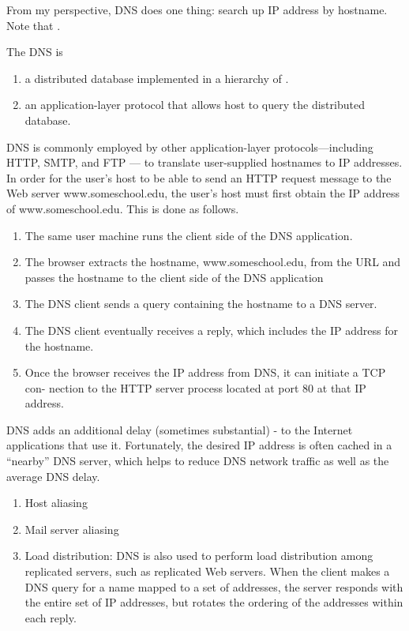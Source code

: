 \hf
From my perspective, DNS does one thing: search up IP address by hostname.\\
Note that .

The DNS is
\begin{enumerate}
    \item a distributed database implemented in a hierarchy of .
    \item an application-layer protocol that allows host to query the distributed database.
\end{enumerate}

DNS is commonly employed by other application-layer protocols---including HTTP,
SMTP, and FTP --- to translate user-supplied hostnames to IP addresses. In order for
the user's host to be able to send an HTTP request message to the Web server www.someschool.edu, the user’s host must first obtain
the IP address of www.someschool.edu. This is done as follows.

\begin{enumerate}
    \item The same user machine runs the client side of the DNS application.
    \item The browser extracts the hostname, www.someschool.edu, from the URL
          and passes the hostname to the client side of the DNS application
    \item The DNS client sends a query containing the hostname to a DNS server.
    \item The DNS client eventually receives a reply, which includes the IP address for
          the hostname.
    \item Once the browser receives the IP address from DNS, it can initiate a TCP con-
          nection to the HTTP server process located at port 80 at that IP address.
\end{enumerate}


DNS adds an additional delay (sometimes substantial) - to the Internet applications
that use it. Fortunately, the
desired IP address is often cached in a “nearby” DNS server, which helps to reduce
DNS network traffic as well as the average DNS delay.



\begin{enumerate}
    \item Host aliasing
    \item Mail server aliasing
    \item Load distribution: DNS is also used to perform load distribution among replicated servers, such as replicated Web servers. When the client makes a DNS query for a name
    mapped to a set of addresses, the server responds with the entire set of IP addresses,
    but rotates the ordering of the addresses within each reply.
\end{enumerate}


